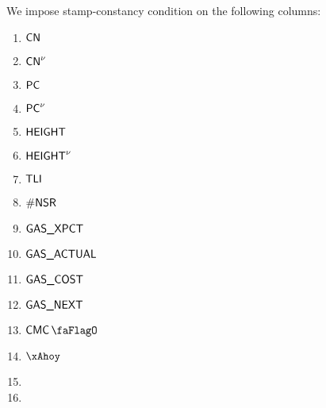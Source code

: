 \noindent We impose stamp-constancy condition on the following columns:
\begin{multicols}{4}
\begin{enumerate}
	\item $\textsf{CN}$
	\item $\textsf{CN}^{\nu}$
	\item $\textsf{PC}$
	\item $\textsf{PC}^{\nu}$
	\item $\textsf{HEIGHT}$
	\item $\textsf{HEIGHT}^{\nu}$
	\item $\textsf{TLI}$
	\item $\textsf{\#NSR}$
	\item $\textsf{GAS}\textsf{\_XPCT}$
	\item $\textsf{GAS}\textsf{\_ACTUAL}$
	\item $\textsf{GAS}\textsf{\_COST}$
	\item $\textsf{GAS}\textsf{\_NEXT}$
	\item $\cmc$
	\item $\xAhoy$
	\item[\vspace{\fill}]
	\item[\vspace{\fill}]
\end{enumerate}
\end{multicols}
